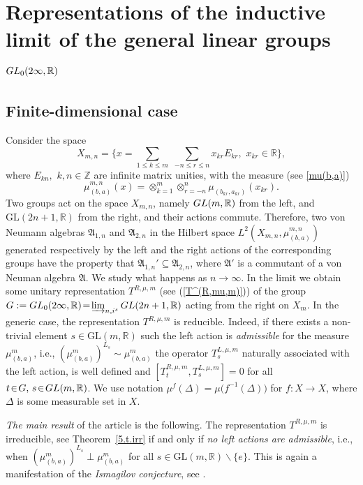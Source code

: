 \documentclass[preprint,12pt]{elsarticle}
\numberwithin{equation}{section}
\begin{document}
\tableofcontents
%


\newpage
\section{Representations of the inductive limit of the general linear groups
${\rm GL}_0(2\infty,{\mathbb R})$
}
%
\subsection{Finite-dimensional case}
Consider the space 
$$
X_{m,n}=\Big\{x=\sum_{1\leq k\leq m}\,\,\sum_{-n\leq r\leq n} x_{kr}E_{kr},\,\,x_{kr}\in
{\mathbb R}\Big\},
$$
%
where $E_{kn},\,\,k,n\in {\mathbb Z}$ are infinite matrix unities, with the measure   (see \eqref{mu(b,a)})
$$
\mu_{(b,a)}^{m,n}(x)=\otimes_{k=1}^m\otimes_{r=-n}^{n}
\mu_{(b_{kr},a_{kr})}(x_{kr}).
$$
%
 Two groups act on the space $X_{m,n}$, namely ${\rm GL}(m,\mathbb R)$ from the left, and $\text{GL}(2n+1,\mathbb R)$ from the right, and their actions commute. 
%
Therefore, two von Neumann algebras ${\mathfrak A}_{1,n}$  and ${\mathfrak A}_{2,n} $ in the Hilbert space $L^2(X_{m,n},\mu_{(b,a)}^{m,n})$  generated 
respectively by the left and the right actions of the corresponding groups have the property that ${\mathfrak A}_{1,n}'\subseteq {\mathfrak A}_{2,n}$, where 
${\mathfrak A}'$ is a commutant of a von Neuman algebra ${\mathfrak A}$.
%
We study what happens as $n\!\to\infty$. In the limit we obtain some unitary representation $T^{R,\mu,m}$ (see (\ref{T^(R,mu,m)})) of the group  
$G:={\rm GL}_0(2\infty,{\mathbb R})\!=\!\varinjlim_{n,i^s}{\rm GL}(2n+1,{\mathbb R})$ acting from the right on $X_m$. In the generic case, the representation 
$T^{R,\mu,m}$ is reducible. Indeed, if there exists a non-trivial element $s\in \text{GL}(m,\mathbb R)$ such the  left action is {\it admissible} for 
the measure $\mu_{(b,a)}^m$, i.e., $(\mu_{(b,a)}^m)^{L_s}\!\sim\! \mu_{(b,a)}^m$  the operator $T^{L,\mu,m}_s$ naturally associated with the left action,
is well defined 
and $[T^{R,\mu,m}_t, T^{L,\mu,m}_s]\!=\!0$ for all $t\!\in\! G,\,s\!\in\! {\rm GL}(m,\mathbb R)$. 
%
We use notation $\mu^f(\Delta)=\mu\big(f^{-1}(\Delta)\big)$ for $f:X\to X$, where $\Delta$ is some measurable set in $X$.
%

{\it The main result} of the article is the following.
The representation  $T^{R,\mu,m}$ is irreducible, see Theorem~\ref{5.t.irr}
if and only if {\it no  left actions are admissible}, i.e.,
when $(\mu_{(b,a)}^m)^{L_s}\perp \mu_{(b,a)}^m$ for all $s\in \text{GL}(m,\mathbb R)\backslash \{e\}$.
This is again a manifestation of the {\it Ismagilov conjecture}, see \cite{Kos_B_09}.
%
\end{document}
